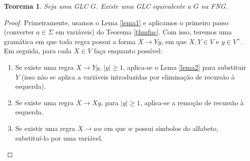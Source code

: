 \documentclass[a4paper]{article}
\newtheorem{Theorem}{Teorema}
\theoremstyle{definition}
\begin{document}
  \begin{Theorem}\label{thmfng}
    Seja uma GLC $G$. Existe uma GLC equivalente a $G$ na FNG.
  \end{Theorem}
  \begin{proof}
    Primeiramente, usamos o Lema \ref{lema1} e aplicamos o primeiro passo
    (converter $a\in \Sigma$ em variáveis) do Teorema \ref{thmfnc}. Com isso,
    teremos uma gramática em que toda regra possui a forma $X \to Yy$, em que
    $X,Y \in V$ e $y \in V^+$. Em seguida, para cada $X \in
    V$ faça enquanto possível:
    \begin{enumerate}
       \item Se existe uma regra $X \to Yy$, $|y| \geq 1$,
          aplica-se o Lema \ref{lema2} para substituir 
        $Y$ (isso não se aplica a variáveis introduzidas por eliminação de
        recursão à esquerda).
      \item Se existe uma regra $X \to Xy$, para $|y| \geq 1$, aplica-se 
        a remoção de recursão à esquerda.
      \item Se existir uma regra $X \to aw$ em que $w$ possui símbolos do
        alfabeto, substituí-lo por uma variável.
    \end{enumerate}
  \end{proof}
\end{document}
